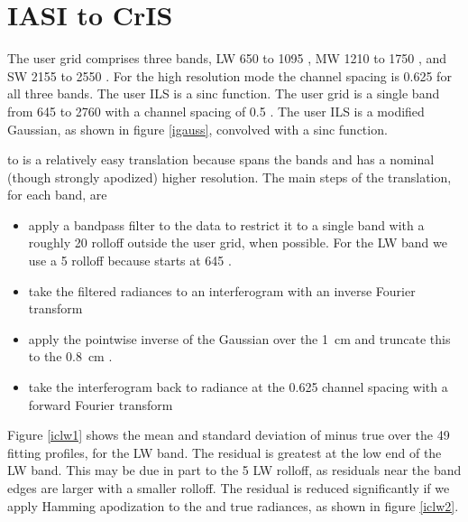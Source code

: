 \documentclass[12pt]{article}
\begin{document}
\section{IASI to CrIS}

The {\cris} user grid comprises three bands, LW 650 to 1095 {\wn},
MW 1210 to 1750 {\wn}, and SW 2155 to 2550 {\wn}.  For the {\cris}
high resolution mode the channel spacing is 0.625 {\wn} for all
three bands.  The {\cris} user ILS is a sinc function.  The {\iasi}
user grid is a single band from 645 to 2760 {\wn} with a channel
spacing of 0.5 {\wn}.  The {\iasi} user ILS is a modified Gaussian,
as shown in figure \ref{igauss}, convolved with a sinc function.

{\iasi} to {\cris} is a relatively easy translation because {\iasi}
spans the {\cris} bands and has a nominal (though strongly apodized)
higher resolution.  The main steps of the translation, for each
{\cris} band, are

\begin{itemize}

  \item apply a bandpass filter to the {\iasi} data to restrict it
    to a single {\cris} band with a roughly 20 {\wn} rolloff outside
    the {\cris} user grid, when possible.  For the LW band we use a
    5 {\wn} rolloff because {\iasi} starts at 645 {\wn}.

  \item take the filtered radiances to an interferogram with an
    inverse Fourier transform

  \item apply the pointwise inverse of the {\iasi} Gaussian over the 
    {\iasi} 1~cm {\opd} and truncate this to the 0.8~cm {\cris} {\opd}.

  \item take the interferogram back to radiance at the {\cris}
    0.625 {\wn} channel spacing with a forward Fourier transform

\end{itemize}

Figure \ref{iclw1} shows the mean and standard deviation of {\iasi}
{\cris} minus true {\cris} over the 49 fitting profiles, for the
{\cris} LW band.  The residual is greatest at the low end of the 
LW band.  This may be due in part to the 5 {\wn} LW rolloff, as
residuals near the band edges are larger with a smaller rolloff.
The residual is reduced significantly if we apply Hamming
apodization to the {\iasi} {\cris} and true {\cris} radiances, as
shown in figure \ref{iclw2}.
\end{document}

